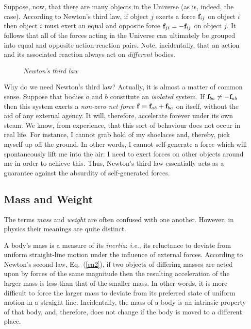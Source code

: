 Suppose, now, that there are many objects in the Universe (as is, indeed, the case). According
to Newton's third law, if object $j$ exerts a force ${\bf f}_{ij}$ on object $i$ then
object $i$ must exert an equal and opposite force ${\bf f}_{ji}=-{\bf f}_{ij}$ on object $j$.
It follows that all of the forces acting in the Universe can ultimately be grouped into equal and opposite
action-reaction pairs. Note, incidentally, that an action and its associated reaction
always act on {\em different} bodies.

\begin{figure}
\epsfysize=1in
\centerline{}
\caption{\em Newton's third law}\label{f23}   
\end{figure}

Why do we need Newton's third law? Actually, it is almost a matter of common sense. 
Suppose that  bodies $a$ and $b$ constitute an {\em isolated} system. If
${\bf f}_{ba}\neq -{\bf f}_{ab}$ then this system  exerts a {\em non-zero net force}
${\bf f} = {\bf f}_{ab}+{\bf f}_{ba}$ on itself,
without the aid of any external agency. It will, therefore, accelerate forever under its
own steam. We know, from experience, that this sort of behaviour does not occur in real
life. For instance, I cannot grab hold of my shoelaces and, thereby, pick myself up off the ground.
In other words, I cannot self-generate a force which will spontaneously lift me into the air:
I need to exert forces on other objects around me in order to achieve this. Thus,
Newton's third law essentially acts as a guarantee against the absurdity of self-generated forces. 

\subsection{Mass and Weight}
The terms {\em mass} and {\em weight} are often confused with one another. However, in physics
their meanings are quite distinct. 

A body's mass is a measure of its
{\em inertia}: {\em i.e.}, its reluctance to deviate from uniform straight-line
motion under the influence of external forces. According to Newton's second law, Eq.~(\ref{en2}),
if two objects of differing masses are acted upon by forces of the same magnitude
then the resulting acceleration of the larger mass is less than that of the smaller
mass. In other words, it is more difficult to force the larger mass to deviate from
its preferred state of uniform motion in a straight line. Incidentally, the mass of
a body is an intrinsic property of that body, and, therefore, does not change if the
body is moved to a different place.


